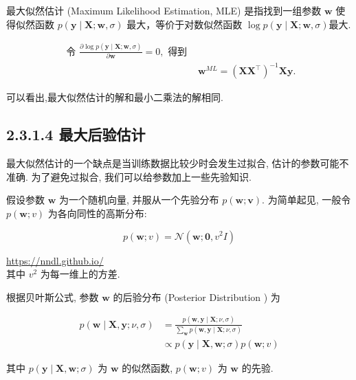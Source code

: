 \documentclass[10pt]{article}
\begin{document}
最大似然估计 (Maximum Likelihood Estimation, MLE) 是指找到一组参数 $\boldsymbol{w}$ 使得似然函数 $p(\boldsymbol{y} \mid \boldsymbol{X} ; \boldsymbol{w}, \sigma)$ 最大，等价于对数似然函数 $\log p(\boldsymbol{y} \mid \boldsymbol{X} ; \boldsymbol{w}, \sigma)$最大.


\begin{align*}
\text { 令 } \frac{\partial \log p(\boldsymbol{y} \mid \boldsymbol{X} ; \boldsymbol{w}, \sigma)}{\partial \boldsymbol{w}}=0, \text { 得到 } & \\
& \boldsymbol{w}^{M L}=\left(\boldsymbol{X} \boldsymbol{X}^{\top}\right)^{-1} \boldsymbol{X} \boldsymbol{y} . \tag{2.52}
\end{align*}


可以看出,最大似然估计的解和最小二乘法的解相同.

\subsection*{2.3.1.4 最大后验估计}
最大似然估计的一个缺点是当训练数据比较少时会发生过拟合, 估计的参数可能不准确. 为了避免过拟合, 我们可以给参数加上一些先验知识.

假设参数 $\boldsymbol{w}$ 为一个随机向量, 并服从一个先验分布 $p(\boldsymbol{w} ; \boldsymbol{v})$. 为简单起见, 一般令 $p(\boldsymbol{w} ; v)$ 为各向同性的高斯分布:


\begin{equation*}
p(\boldsymbol{w} ; v)=\mathcal{N}\left(\boldsymbol{w} ; \mathbf{0}, v^{2} I\right) \tag{2.53}
\end{equation*}


\href{https://nndl.github.io/}{https://nndl.github.io/}\\
其中 $v^{2}$ 为每一维上的方差.

根据贝叶斯公式, 参数 $\boldsymbol{w}$ 的后验分布 (Posterior Distribution ) 为


\begin{align*}
p(\boldsymbol{w} \mid \boldsymbol{X}, \boldsymbol{y} ; \nu, \sigma) & =\frac{p(\boldsymbol{w}, \boldsymbol{y} \mid \boldsymbol{X} ; \nu, \sigma)}{\sum_{\boldsymbol{w}} p(\boldsymbol{w}, \boldsymbol{y} \mid \boldsymbol{X} ; \nu, \sigma)}  \tag{2.54}\\
& \propto p(\boldsymbol{y} \mid \boldsymbol{X}, \boldsymbol{w} ; \sigma) p(\boldsymbol{w} ; v) \tag{2.55}
\end{align*}


其中 $p(\boldsymbol{y} \mid \boldsymbol{X}, \boldsymbol{w} ; \sigma)$ 为 $\boldsymbol{w}$ 的似然函数, $p(\boldsymbol{w} ; v)$ 为 $\boldsymbol{w}$ 的先验.
\end{document}
